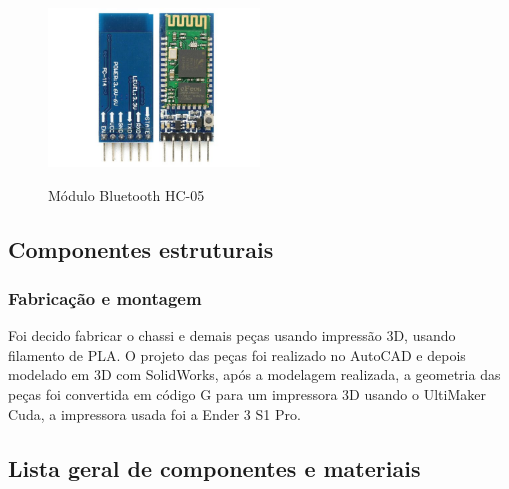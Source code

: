 \begin{figure}[htb]
	\centering
	\includegraphics[width=0.5\textwidth]{figures/hc_05}
	\caption{Módulo Bluetooth HC-05}
	\label{fig:hc_05}
	\cite{hc05_image}
\end{figure}

\subsection{Componentes estruturais}

\subsubsection{Fabricação e montagem}
Foi decido fabricar o chassi e demais peças usando impressão 3D, usando filamento de PLA.
O projeto das peças foi realizado no AutoCAD e depois modelado em 3D com SolidWorks, após a modelagem realizada,
a geometria das peças foi convertida em código G para um impressora 3D usando o UltiMaker Cuda, a impressora usada foi a Ender 3 S1 Pro.


\subsection{Lista geral de componentes e materiais}

